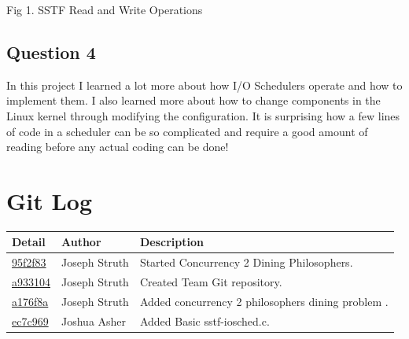 \documentclass[10pt,draftclsnofoot,onecolumn, compsoc]{IEEEtran}
\begin{document}
\vspace{5mm} %

Fig 1. SSTF Read and Write Operations
\centering
\begin{figure}[htb]
\centering
\end{figure}

\newpage
\subsection{Question 4}
In this project I learned a lot more about how I/O Schedulers operate and how to implement them. I also learned more about how to change components in the Linux kernel through modifying the configuration. It is surprising how a few lines of code in a scheduler can be so complicated and require a good amount of reading before any actual coding can be done! 

\section{Git Log}

\begin{tabular}{| l | l | p{15cm} |}\textbf{Detail} & \textbf{Author} & \textbf{Description}\\\hline
\href{https://github.com/struthj/CS444/commit/95f2f83c730dfb35f0292b3a825747fdde110c49}{95f2f83} & Joseph Struth & Started Concurrency 2 Dining Philosophers.\\\hline
\href{https://github.com/struthj/CS444-1303/commit/a933104c6c986f873737877b29bcf222933f805d}{a933104} & Joseph Struth & Created Team Git repository.\\\hline
\href{https://github.com/struthj/CS444-1303/commit/a176f8a30f2adef093bb56e16eb97c264fc956ec}{a176f8a} & Joseph Struth & Added concurrency 2 philosophers dining problem .\\\hline
\href{https://github.com/struthj/CS444-1303/commit/ec7c9692fc67d925772e42ce9317378f85fdb296}{ec7c969} & Joshua Asher & Added Basic sstf-iosched.c.\\\hline
\end{tabular}
\end{document}
